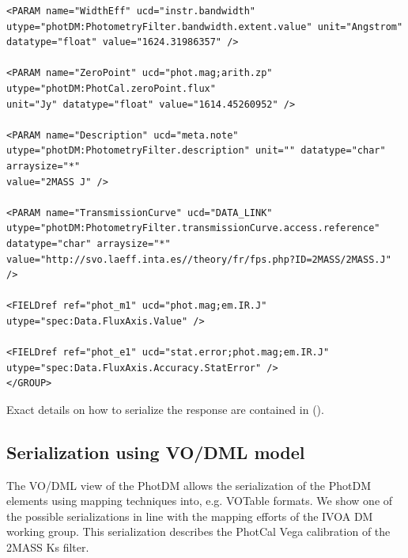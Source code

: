 \documentclass[11pt,a4paper]{ivoa}
\begin{document}
\begin{appendices}
\begin{verbatim}
<PARAM name="WidthEff" ucd="instr.bandwidth"
utype="photDM:PhotometryFilter.bandwidth.extent.value" unit="Angstrom"
datatype="float" value="1624.31986357" />

<PARAM name="ZeroPoint" ucd="phot.mag;arith.zp" utype="photDM:PhotCal.zeroPoint.flux"
unit="Jy" datatype="float" value="1614.45260952" />

<PARAM name="Description" ucd="meta.note"
utype="photDM:PhotometryFilter.description" unit="" datatype="char" arraysize="*"
value="2MASS J" />

<PARAM name="TransmissionCurve" ucd="DATA_LINK"
utype="photDM:PhotometryFilter.transmissionCurve.access.reference"
datatype="char" arraysize="*"
value="http://svo.laeff.inta.es//theory/fr/fps.php?ID=2MASS/2MASS.J" />

<FIELDref ref="phot_m1" ucd="phot.mag;em.IR.J"
utype="spec:Data.FluxAxis.Value" />

<FIELDref ref="phot_e1" ucd="stat.error;phot.mag;em.IR.J"
utype="spec:Data.FluxAxis.Accuracy.StatError" />
</GROUP>

\end{verbatim}



\vspace{\baselineskip}
Exact details on how to serialize the response are contained in (\cite{derriere}).
\par

\subsection{Serialization using VO/DML model} \label{appendixmapping}
The VO/DML view of the PhotDM allows the serialization of the PhotDM elements using mapping techniques into, e.g. VOTable formats. We show one of the possible serializations in line with the mapping efforts of the IVOA DM working group. This serialization describes the PhotCal Vega calibration of the 2MASS Ks filter.



\end{appendices}


\end{document}
